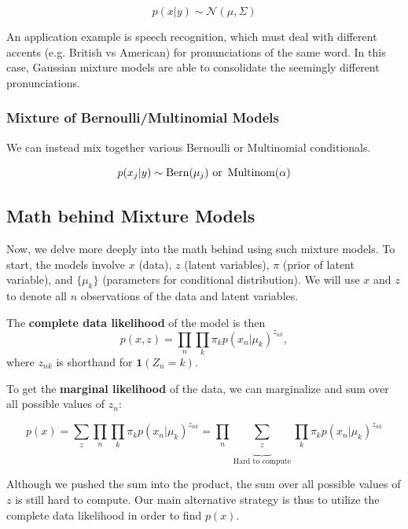 \documentclass{article}
\begin{document}
	\[p(x | y) \sim \mathcal{N}(\mu, \Sigma)  \]

	An application example is speech recognition, which must deal with different accents (e.g. British vs American) for pronunciations of the same word.  In this case, Gaussian mixture models are able to consolidate the seemingly different pronunciations.


\subsubsection{Mixture of Bernoulli/Multinomial Models}

	We can instead mix together various Bernoulli or Multinomial conditionals. 

	\[ p(x_j | y) \sim \operatorname{Bern}(\mu_j) \text{ or } \operatorname{Multinom}(\alpha) \]



\subsection{Math behind Mixture Models}

Now, we delve more deeply into the math behind using such mixture models.  To start, the models involve $x$ (data), $z$ (latent variables), $\pi$ (prior of latent variable), and $\{\mu_k\}$ (parameters for conditional distribution).  We will use $x$ and $z$ to denote all $n$ observations of the data and latent variables.

\smallskip

The {\bf complete data likelihood} of the model is then 
\[ p(x, z) = \prod_{n} \prod_{k} \pi_k p(x_n | \mu_k)^{z_{nk}},  \]
where $z_{nk}$ is shorthand for $\mathbf{1}(Z_n = k)$.

To get the {\bf marginal likelihood} of the data, we can marginalize and sum over all possible values of $z_n$:	

\[p(x) = \sum_{z} \prod_n \prod_k \pi_k p(x_n | \mu_k)^{{z_{nk}}} = \prod_n \underbrace{\sum_{z}}_{\text{Hard to compute}} \prod_k \pi_k p(x_n | \mu_k)^{z_{nk}}  \]

Although we pushed the sum into the product, the sum over all possible values of $z$ is still hard to compute.  Our main alternative strategy is thus to utilize the complete data likelihood in order to find $p(x)$.  
\end{document}
